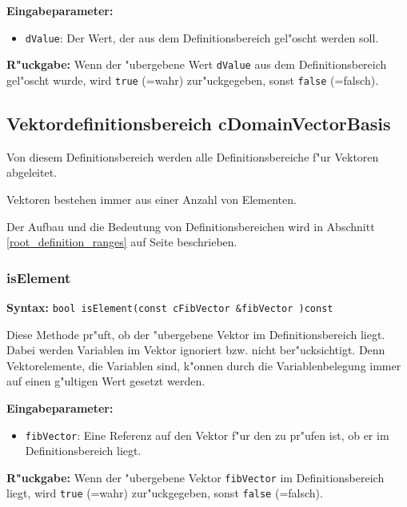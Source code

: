 \bigskip\noindent
\textbf{Eingabeparameter:}
\begin{itemize}
 \item \verb|dValue|: Der Wert, der aus dem Definitionsbereich gel"oscht werden soll.
\end{itemize}

\bigskip\noindent
\textbf{R"uckgabe:} Wenn der "ubergebene Wert \verb|dValue| aus dem Definitionsbereich gel"oscht wurde, wird \verb|true| (=wahr) zur"uckgegeben, sonst \verb|false| (=falsch).



\subsection{Vektordefinitionsbereich cDomainVectorBasis}

Von diesem Definitionsbereich werden alle Definitionsbereiche f"ur Vektoren abgeleitet.

Vektoren bestehen immer aus einer Anzahl von Elementen.

Der Aufbau und die Bedeutung von Definitionsbereichen wird in Abschnitt \ref{root_definition_ranges} auf Seite \pageref{root_definition_ranges} beschrieben.


\subsubsection{isElement}

\textbf{Syntax:} \verb|bool isElement(const cFibVector &fibVector )const|

\bigskip\noindent
Diese Methode pr"uft, ob der "ubergebene Vektor im Definitionsbereich liegt.
Dabei werden Variablen im Vektor ignoriert bzw. nicht ber"ucksichtigt. Denn Vektorelemente, die Variablen sind, k"onnen durch die Variablenbelegung immer auf einen g"ultigen Wert gesetzt werden.

\bigskip\noindent
\textbf{Eingabeparameter:}
\begin{itemize}
 \item \verb|fibVector|: Eine Referenz auf den Vektor f"ur den zu pr"ufen ist, ob er im Definitionsbereich liegt.
\end{itemize}

\bigskip\noindent
\textbf{R"uckgabe:} Wenn der "ubergebene Vektor \verb|fibVector| im Definitionsbereich liegt, wird \verb|true| (=wahr) zur"uckgegeben, sonst \verb|false| (=falsch).


